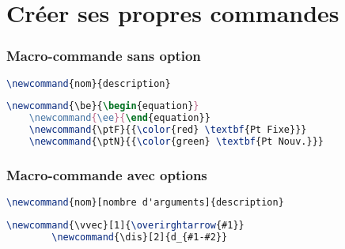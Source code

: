 \section{Créer ses propres commandes}

\begin{frame}[containsverbatim]
    \frametitle{Macro-commande sans option}
    \begin{lstlisting}[language=TeX, caption=Forme de la commande]
        \newcommand{nom}{description}
    \end{lstlisting}
    \begin{lstlisting}[language=TeX, caption=Exemples]
    \newcommand{\be}{\begin{equation}}
    \newcommand{\ee}{\end{equation}}
    \newcommand{\ptF}{{\color{red} \textbf{Pt Fixe}}}
    \newcommand{\ptN}{{\color{green} \textbf{Pt Nouv.}}}
    \end{lstlisting}
\end{frame}

\begin{frame}[containsverbatim]
    \frametitle{Macro-commande avec options}
    \begin{lstlisting}[language=TeX, caption=Forme de la commande]
        \newcommand{nom}[nombre d'arguments]{description}
    \end{lstlisting}
    \begin{lstlisting}[language=TeX, caption=Exemples]
        \newcommand{\vvec}[1]{\overirghtarrow{#1}}
        \newcommand{\dis}[2]{d_{#1-#2}}
    \end{lstlisting}
\end{frame}
